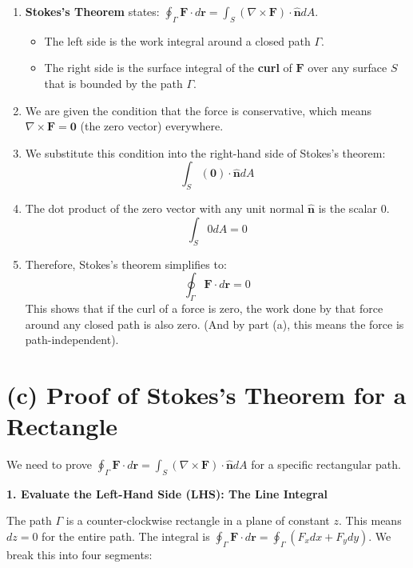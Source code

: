 \documentclass[11pt, a4paper]{article} %
\begin{document}
\begin{enumerate}
    \item \textbf{Stokes's Theorem} states: $\oint_\Gamma \mathbf{F}\cdot d \mathbf{r} = \int_S (\nabla \times \mathbf{F}) \cdot \hat{\mathbf{n}} dA$.
    \begin{itemize}
        \item The left side is the work integral around a closed path $\Gamma$.
        \item The right side is the surface integral of the \textbf{curl} of $\mathbf{F}$ over any surface $S$ that is bounded by the path $\Gamma$.
    \end{itemize}
    \item We are given the condition that the force is conservative, which means $\nabla \times \mathbf{F} = \mathbf{0}$ (the zero vector) everywhere.
    \item We substitute this condition into the right-hand side of Stokes's theorem:
    $$\int_S (\mathbf{0}) \cdot \hat{\mathbf{n}} dA$$
    \item The dot product of the zero vector with any unit normal $\hat{\mathbf{n}}$ is the scalar $0$.
    $$\int_S 0 dA = 0$$
    \item Therefore, Stokes's theorem simplifies to:
    $$\oint_\Gamma \mathbf{F}\cdot d \mathbf{r} = 0$$
    This shows that if the curl of a force is zero, the work done by that force around any closed path is also zero. (And by part (a), this means the force is path-independent).
\end{enumerate}

\hrulefill

\section*{(c) Proof of Stokes's Theorem for a Rectangle}

We need to prove $\oint_\Gamma \mathbf{F} \cdot d\mathbf{r} = \int_S (\nabla \times \mathbf{F}) \cdot \hat{\mathbf{n}} d A$ for a specific rectangular path.

\textbf{1. Evaluate the Left-Hand Side (LHS): The Line Integral}

The path $\Gamma$ is a counter-clockwise rectangle in a plane of constant $z$. This means $dz=0$ for the entire path. The integral is $\oint_\Gamma \mathbf{F} \cdot d\mathbf{r} = \oint_\Gamma (F_x dx + F_y dy)$. We break this into four segments:
\end{document}
